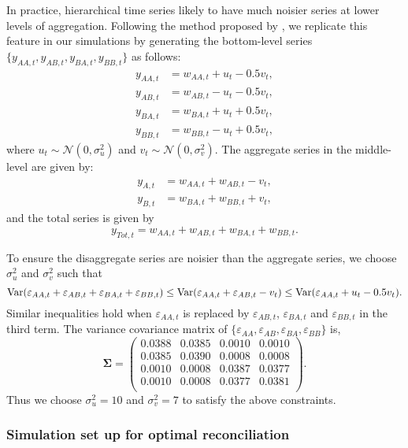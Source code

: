 In practice, hierarchical time series likely to have much noisier series at lower levels of aggregation. Following the method proposed by \citet{Wickramasuriya2018}, we replicate this feature in our simulations by generating the bottom-level series $\{y_{AA,t},y_{AB,t},y_{BA,t},y_{BB,t}\}$ as follows: 
\begin{align*}
y_{AA,t} &= w_{AA,t} + u_t - 0.5v_t,\\
y_{AB,t} &= w_{AB,t} - u_t - 0.5v_t,\\
y_{BA,t} &= w_{BA,t} + u_t + 0.5v_t,\\
y_{BB,t} &= w_{BB,t} - u_t + 0.5v_t,
\end{align*}
where $u_t \sim \mathcal{N}(0,\sigma^2_u)$ and $v_t \sim \mathcal{N}(0,\sigma^2_v)$. The aggregate series in the middle-level are given by:
\begin{align*}
y_{A,t} &= w_{AA,t} + w_{AB,t} - v_t,\\
y_{B,t} &= w_{BA,t} + w_{BB,t} + v_t,
\end{align*}
and the total series is given by
\[
  y_{Tot,t} = w_{AA,t} + w_{AB,t} + w_{BA,t} + w_{BB,t}.
\]


To ensure the disaggregate series are noisier than the aggregate series, we choose $\sigma^2_u$ and $\sigma^2_v$ such that
\[
  \text{Var}(\varepsilon_{AA,t} + \varepsilon_{AB,t} + \varepsilon_{BA,t} + \varepsilon_{BB,t})
  \le \text{Var}(\varepsilon_{AA,t}+\varepsilon_{AB,t}-v_t)
  \le \text{Var}(\varepsilon_{AA,t}+u_t-0.5v_t).
\]
Similar inequalities hold when $\varepsilon_{AA,t}$ is replaced by $\varepsilon_{AB,t}$, $\varepsilon_{BA,t}$ and $\varepsilon_{BB,t}$ in the third term.
The variance covariance matrix of $\{\varepsilon_{AA}, \varepsilon_{AB}, \varepsilon_{BA}, \varepsilon_{BB}\}$ is,
$$
\bm{\Sigma} = \begin{pmatrix}
				0.0388 & 0.0385 & 0.0010 & 0.0010\\
				0.0385 & 0.0390 & 0.0008 & 0.0008 \\
				0.0010 & 0.0008 & 0.0387 & 0.0377 \\
				0.0010 & 0.0008 & 0.0377 & 0.0381 \\
			 \end{pmatrix}.
$$
Thus we choose $\sigma^2_u = 10$ and $\sigma^2_v = 7$ to satisfy the above constraints. 

\subsubsection{Simulation set up for optimal reconciliation}

